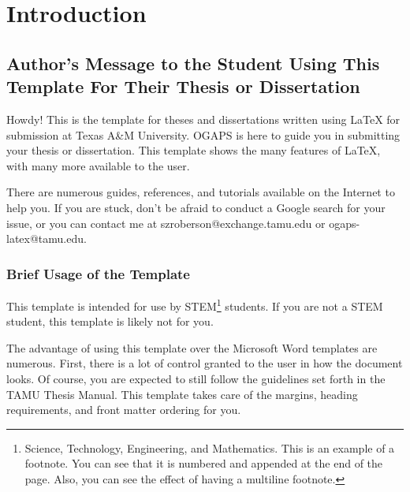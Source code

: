 %
%
%


\chapter{Introduction}

\section{Author's Message to the Student Using This Template For Their Thesis or Dissertation}

Howdy! This is the template for theses and dissertations written using \LaTeX{} for submission at Texas A\&M University. \ac{OGAPS} is here to guide you in submitting your thesis or dissertation. This template shows the many features of \LaTeX{}, with many more available to the user.

There are numerous guides, references, and tutorials available on the Internet to help you. If you are stuck, don't be afraid to conduct a Google search for your issue, or you can contact me at szroberson@exchange.tamu.edu or ogaps-latex@tamu.edu.


\subsection{Brief Usage of the Template}

This template is intended for use by STEM\footnote{Science, Technology, Engineering, and Mathematics. This is an example of a footnote. You can see that it is numbered and appended at the end of the page. Also, you can see the effect of having a multiline footnote.} students. If you are not a STEM student, this template is likely not for you.

The advantage of using this template over the Microsoft Word templates are numerous. First, there is a lot of control granted to the user in how the document looks. Of course, you are expected to still follow the guidelines set forth in the TAMU Thesis Manual. This template takes care of the margins, heading requirements, and front matter ordering for you.


